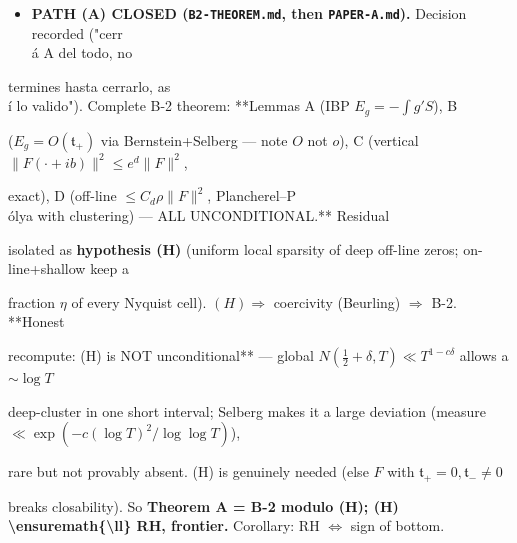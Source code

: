 \documentclass[10pt]{article}
\begin{document}
\begin{itemize}
\item \textbf{PATH (A) CLOSED (\texttt{B2-THEOREM.md}, then \texttt{PAPER-A.md}).} Decision recorded ("cerr\\\'a A del todo, no
\end{itemize}
  termines hasta cerrarlo, as\\\'i lo valido"). Complete B-2 theorem: **Lemmas A (IBP $E_g=-\int g'S$), B\par
  ($E_g=O(\mathfrak t_+)$ via Bernstein+Selberg --- note $O$ not $o$), C (vertical $\|F(\cdot+ib)\|^2\le e^d\|F\|^2$,\par
  exact), D (off-line $\le C_d\rho\|F\|^2$, Plancherel--P\\\'olya with clustering) --- ALL UNCONDITIONAL.** Residual\par
  isolated as \textbf{hypothesis (H)} (uniform local sparsity of deep off-line zeros; on-line+shallow keep a\par
  fraction $\eta$ of every Nyquist cell). $(H)\Rightarrow$ coercivity (Beurling) $\Rightarrow$ B-2. **Honest\par
  recompute: (H) is NOT unconditional** --- global $N(\tfrac12+\delta,T)\ll T^{1-c\delta}$ allows a $\sim\log T$\par
  deep-cluster in one short interval; Selberg makes it a large deviation (measure $\ll\exp(-c(\log T)^2/\log\log T)$),\par
  rare but not provably absent. (H) is genuinely needed (else $F$ with $\mathfrak t_+=0,\mathfrak t_-\ne0$\par
  breaks closability). So \textbf{Theorem A = B-2 modulo (H); (H) \textbackslash{}ensuremath\{\textbackslash{}ll\} RH, frontier.} Corollary: RH \ensuremath{\iff} sign of bottom.\par
\end{document}
